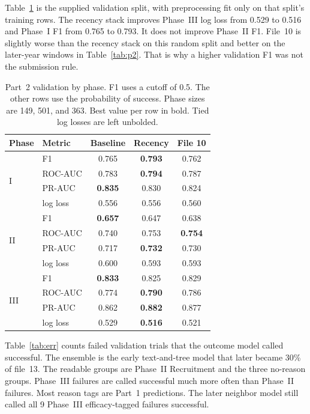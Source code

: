 \documentclass[10pt,twocolumn,letterpaper]{article}
\begin{document}
Table~\ref{tab:phase} is the supplied validation split, with preprocessing fit
only on that split's training rows. The recency stack improves Phase~III log
loss from 0.529 to 0.516 and Phase~I F1 from 0.765 to 0.793. It does not
improve Phase~II F1. File~10 is slightly worse than the recency stack on this
random split and better on the later-year windows in Table~\ref{tab:p2}. That
is why a higher validation F1 was not the submission rule.

\begin{table}[t]
\centering\small
\setlength{\tabcolsep}{2.5pt}
\begin{tabular}{llccc}
\toprule
Phase & Metric & Baseline & Recency & File 10 \\
\midrule
\multirow{4}{*}{I}
 & F1       & 0.765 & \textbf{0.793} & 0.762 \\
 & ROC-AUC  & 0.783 & \textbf{0.794} & 0.787 \\
 & PR-AUC   & \textbf{0.835} & 0.830 & 0.824 \\
 & log loss & 0.556 & 0.556 & 0.560 \\
\midrule
\multirow{4}{*}{II}
 & F1       & \textbf{0.657} & 0.647 & 0.638 \\
 & ROC-AUC  & 0.740 & 0.753 & \textbf{0.754} \\
 & PR-AUC   & 0.717 & \textbf{0.732} & 0.730 \\
 & log loss & 0.600 & 0.593 & 0.593 \\
\midrule
\multirow{4}{*}{III}
 & F1       & \textbf{0.833} & 0.825 & 0.829 \\
 & ROC-AUC  & 0.774 & \textbf{0.790} & 0.786 \\
 & PR-AUC   & 0.862 & \textbf{0.882} & 0.877 \\
 & log loss & 0.529 & \textbf{0.516} & 0.521 \\
\bottomrule
\end{tabular}
\caption{Part~2 validation by phase. F1 uses a cutoff of 0.5. The other rows
use the probability of success. Phase sizes are 149, 501, and 363. Best value
per row in bold. Tied log losses are left unbolded.}
\label{tab:phase}
\end{table}

Table~\ref{tab:err} counts failed validation trials that the outcome model
called successful. The ensemble is the early text-and-tree model that later
became 30\% of file~13. The readable groups are Phase~II Recruitment and the
three no-reason groups. Phase~III failures are called successful much more
often than Phase~II failures. Most reason tags are Part~1 predictions. The
later neighbor model still called all 9 Phase~III efficacy-tagged failures
successful.
\end{document}
